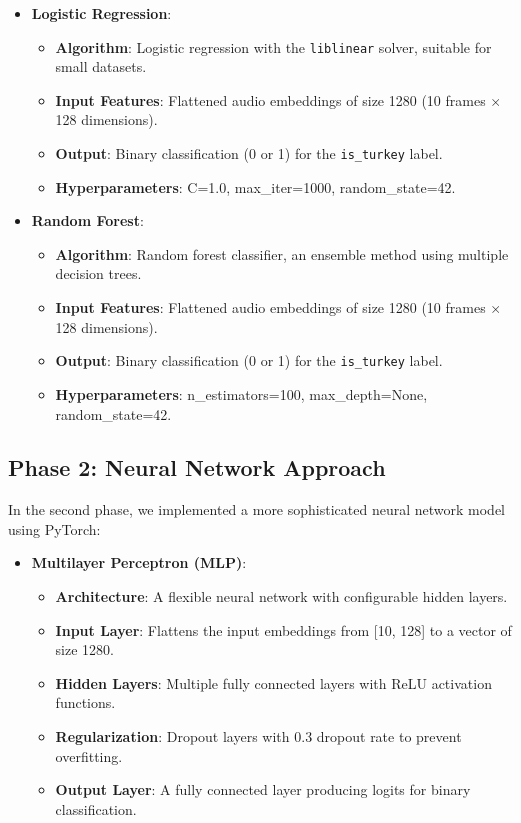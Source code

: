 \documentclass[12pt, a4paper]{article}
\begin{document}
\begin{itemize}
    \item \textbf{Logistic Regression}:
        \begin{itemize}
            \item \textbf{Algorithm}: Logistic regression with the \texttt{liblinear} solver, suitable for small datasets.
            \item \textbf{Input Features}: Flattened audio embeddings of size 1280 (10 frames $\times$ 128 dimensions).
            \item \textbf{Output}: Binary classification (0 or 1) for the \texttt{is\_turkey} label.
            \item \textbf{Hyperparameters}: C=1.0, max\_iter=1000, random\_state=42.
        \end{itemize}
    \item \textbf{Random Forest}:
        \begin{itemize}
            \item \textbf{Algorithm}: Random forest classifier, an ensemble method using multiple decision trees.
            \item \textbf{Input Features}: Flattened audio embeddings of size 1280 (10 frames $\times$ 128 dimensions).
            \item \textbf{Output}: Binary classification (0 or 1) for the \texttt{is\_turkey} label.
            \item \textbf{Hyperparameters}: n\_estimators=100, max\_depth=None, random\_state=42.
        \end{itemize}
\end{itemize}

\subsection{Phase 2: Neural Network Approach}
In the second phase, we implemented a more sophisticated neural network model using PyTorch:

\begin{itemize}
    \item \textbf{Multilayer Perceptron (MLP)}:
        \begin{itemize}
            \item \textbf{Architecture}: A flexible neural network with configurable hidden layers.
            \item \textbf{Input Layer}: Flattens the input embeddings from [10, 128] to a vector of size 1280.
            \item \textbf{Hidden Layers}: Multiple fully connected layers with ReLU activation functions.
            \item \textbf{Regularization}: Dropout layers with 0.3 dropout rate to prevent overfitting.
            \item \textbf{Output Layer}: A fully connected layer producing logits for binary classification.
        \end{itemize}
\end{itemize}
\end{document}
